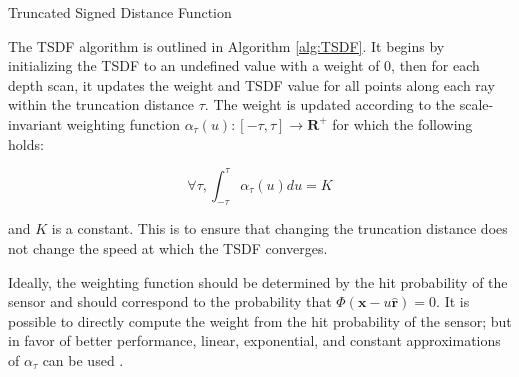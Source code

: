 \documentclass[10pt,twocolumn,letterpaper]{article}
\begin{document}
\begin{algorithm} 
	\caption{Truncated Signed Distance Function}
	\label{alg:TSDF}
	\begin{algorithmic}[1]
				\label{alg:line:dynamic_tsdf}
				    	\label{alg:line:voxel_carve}
					\EndIf
			    \EndFor
					\label{alg:line:tsdf_update}
				\EndFor
			\EndFor
		\EndFor
	\end{algorithmic}
\end{algorithm}

The TSDF algorithm is outlined in Algorithm \ref{alg:TSDF}. It begins by
initializing the TSDF to an undefined value with a weight of $0$, then for each
depth scan, it updates the weight and TSDF value for all points along each ray
within the truncation distance $\tau$. The weight is updated according
to the scale-invariant weighting function $\alpha_{\tau}(u) : [-\tau,\tau]\to
\mathbf{R^{+}} $ for which the following holds:

\begin{equation}
	\forall \tau, \int_{-\tau}^{\tau} \alpha_{\tau}(u) du = K 
\end{equation}
 
 \noindent and $K$ is a constant. This is to ensure that changing the truncation
 distance does not change the speed at which the TSDF converges.  
 
Ideally, the weighting function should be determined by the hit probability of
the sensor and should correspond to the probability that $\Phi(\mathbf{x} - u
\mathbf{\hat{r}}) = 0$. It is possible \cite{Nguyen2012} to
directly compute the weight from the hit probability of the sensor; but in favor
of better performance, linear, exponential, and constant approximations of
$\alpha_{\tau}$ can be used \cite{Curless1996, Newcombe, Whelan2013, Bylow2013}.
\end{document}
